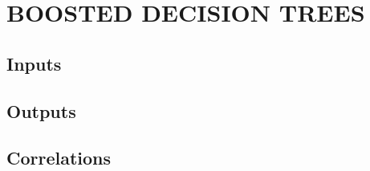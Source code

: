 %
%
%
%


\chapter{\texorpdfstring{\uppercase{Boosted Decision Trees}}{Boosted Decision Trees}}

\section{Inputs}
\label{appendix:BDT_Inputs}
\section{Outputs}
\label{appendix:BDT_Outputs}
\section{Correlations}
\label{appendix:BDT_Correlations}

